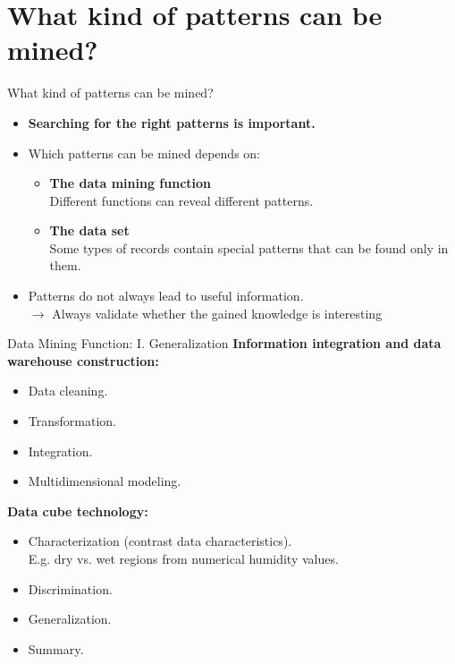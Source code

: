 \section{What kind of patterns can be mined?}

\begin{frame}{What kind of patterns can be mined?}
	\begin{itemize}
		\item \textbf{Searching for the right patterns is important.}
		\item Which patterns can be mined depends on:
		      \begin{itemize}
			      \item \textbf{The data mining function} \\
			            \small{Different functions can reveal different patterns.}
			      \item \textbf{The data set} \\
			            \small{Some types of records contain special patterns that
				            can be found only in them.}
		      \end{itemize}
		\item Patterns do not always lead to useful information. \\
		      $\rightarrow$ Always validate whether the gained knowledge is
		      interesting
	\end{itemize}
\end{frame}

\begin{frame}{Data Mining Function: I. Generalization}
	\textbf{Information integration and data warehouse construction:}
	\begin{itemize}
		\item Data cleaning.
		\item Transformation.
		\item Integration.
		\item Multidimensional modeling.
	\end{itemize}
	\textbf{Data cube technology:}
	\begin{itemize}
		\item Characterization (contrast data characteristics).\\
		      E.g. dry vs. wet regions from numerical humidity values.
		\item Discrimination.
		\item Generalization.
		\item Summary.
	\end{itemize}
\end{frame}

